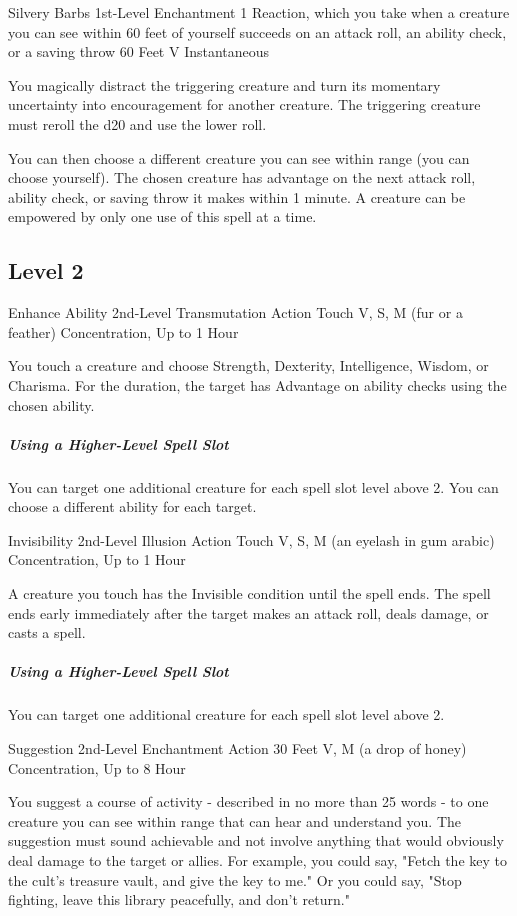 \documentclass[letterpaper,openany,oneside,twocolumn]{book}
\begin{document}
\DndSpellHeader
  {Silvery Barbs}
  {1st-Level Enchantment}
  {1 Reaction, which you take when a creature you can see within 60 feet of yourself succeeds on an attack roll, an ability check, or a saving throw}
  {60 Feet}
  {V}
  {Instantaneous}

You magically distract the triggering creature and turn its momentary uncertainty into encouragement for another creature. The triggering creature must reroll the d20 and use the lower roll.

You can then choose a different creature you can see within range (you can choose yourself). The chosen creature has advantage on the next attack roll, ability check, or saving throw it makes within 1 minute. A creature can be empowered by only one use of this spell at a time.

\subsection*{Level 2}

\DndSpellHeader
  {Enhance Ability}
  {2nd-Level Transmutation}
  {Action}
  {Touch}
  {V, S, M (fur or a feather)}
  {Concentration, Up to 1 Hour}

You touch a creature and choose Strength, Dexterity, Intelligence, Wisdom, or Charisma. For the duration, the target has Advantage on ability checks using the chosen ability.

\subparagraph*{Using a Higher-Level Spell Slot} You can target one additional creature for each spell slot level above 2. You can choose a different ability for each target.

\DndSpellHeader
  {Invisibility}
  {2nd-Level Illusion}
  {Action}
  {Touch}
  {V, S, M (an eyelash in gum arabic)}
  {Concentration, Up to 1 Hour}

A creature you touch has the Invisible condition until the spell ends. The spell ends early immediately after the target makes an attack roll, deals damage, or casts a spell.

\subparagraph*{Using a Higher-Level Spell Slot} You can target one additional creature for each spell slot level above 2.

\DndSpellHeader
  {Suggestion}
  {2nd-Level Enchantment}
  {Action}
  {30 Feet}
  {V, M (a drop of honey)}
  {Concentration, Up to 8 Hour}

You suggest a course of activity - described in no more than 25 words - to one creature you can see within range that can hear and understand you. The suggestion must sound achievable and not involve anything that would obviously deal damage to the target or allies. For example, you could say, "Fetch the key to the cult's treasure vault, and give the key to me." Or you could say, "Stop fighting, leave this library peacefully, and don't return."
\end{document}
